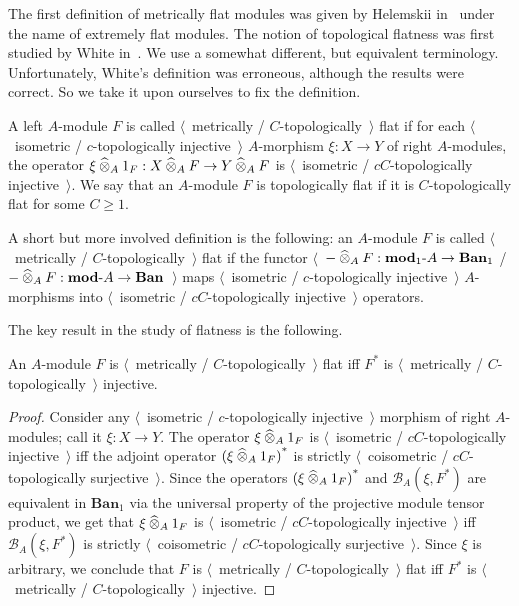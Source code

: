 The first definition of metrically flat modules was given by Helemskii 
in~\cite{HelMetrFlatNorMod} under the name of extremely flat modules. The 
notion of topological flatness was first studied by 
White in~\cite{WhiteInjmoduAlg}. We use a somewhat different, but equivalent  
terminology. Unfortunately, White's definition was erroneous, although the results 
were correct. So we take it upon ourselves to fix the definition.

\begin{definition}\label{MetCTopFlatMod} 
A left $A$-module $F$ is 
called $\langle$~metrically / $C$-topologically~$\rangle$ 
flat if for each $\langle$~isometric / $c$-topologically injective~$\rangle$ 
$A$-morphism $\xi:X\to Y$ of right $A$-modules, the 
operator $\xi\mathbin{\widehat{\otimes}}_{A} 1_F:X\mathbin{\widehat{\otimes}}_{A} F\to Y\mathbin{\widehat{\otimes}}_{A} F$ 
is $\langle$~isometric / $c C$-topologically injective~$\rangle$. We say that an 
$A$-module $F$ is topologically flat if it is $C$-topologically flat for 
some $C\geq 1$.
\end{definition}

A short but more involved definition is the following: an $A$-module $F$ is
called $\langle$~metrically / $C$-topologically~$\rangle$ flat if the functor
$\langle$~$-\mathbin{\widehat{\otimes}}_{A}F:\mathbf{mod}_1\text{-}A\to\mathbf{Ban}_1$ /
$-\mathbin{\widehat{\otimes}}_{A}F:\mathbf{mod}\text{-}A\to\mathbf{Ban}$~$\rangle$ maps
$\langle$~isometric / $c$-topologically injective~$\rangle$ $A$-morphisms into
$\langle$~isometric / $c C$-topologically injective~$\rangle$ operators.

The key result in the study of flatness is the following.

\begin{proposition}\label{MetCTopFlatCharac}
An $A$-module $F$ is
$\langle$~metrically / $C$-topologically~$\rangle$ flat iff $F^*$ is
$\langle$~metrically / $C$-topologically~$\rangle$ injective.
\end{proposition}
\begin{proof} Consider any $\langle$~isometric / $c$-topologically
injective~$\rangle$ morphism of right $A$-modules; call it $\xi:X\to Y$. The
operator $\xi\mathbin{\widehat{\otimes}}_{A} 1_F$ is $\langle$~isometric / $c C$-topologically
injective~$\rangle$ iff the adjoint operator ${(\xi\mathbin{\widehat{\otimes}}_{A} 1_F)}^*$ is
strictly $\langle$~coisometric / $c C$-topologically surjective~$\rangle$. 
Since the operators ${(\xi\mathbin{\widehat{\otimes}}_{A} 1_F)}^*$ and $\mathcal{B}_A(\xi,F^*)$ 
are equivalent in $\mathbf{Ban}_1$ via the universal property of the projective module 
tensor product, we get that $\xi\mathbin{\widehat{\otimes}}_{A} 1_F$ 
is $\langle$~isometric / $c C$-topologically injective~$\rangle$ 
iff $\mathcal{B}_A(\xi,F^*)$ is 
strictly $\langle$~coisometric / $c C$-topologically surjective~$\rangle$. 
Since $\xi$ is arbitrary, we conclude that $F$ 
is $\langle$~metrically / $C$-topologically~$\rangle$ flat iff
$F^*$ is $\langle$~metrically / $C$-topologically~$\rangle$ injective.
\end{proof}

